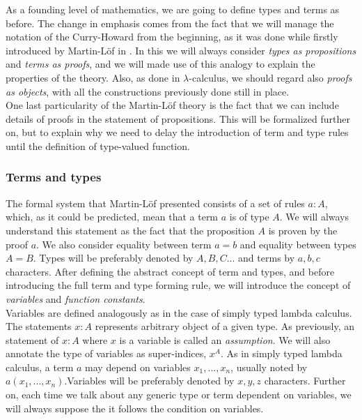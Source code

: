 As a founding level of mathematics, we are going to define types and terms as before. The change in emphasis comes from the fact that we will manage the notation of the Curry-Howard from the beginning, as it was done while firstly introduced by Martin-L\"of in \cite{martinlof1973intuitionistic}. In this we will always consider \emph{types as propositions} and \emph{terms as proofs}, and we will made use of this analogy to explain the properties of the theory. Also, as done in $\lambda$-calculus, we should regard also \emph{proofs as objects}, with all the constructions previously done still in place.\\

One last particularity of the Martin-L\"of theory is the fact that we can include details of proofs in the statement of propositions. This will be formalized further on, but to explain why we need to delay the introduction of term and type rules until the definition of type-valued function.

\subsubsection{Terms and types}

The formal system that Martin-L\"of presented consists of a set of rules $a : A$, which, as it could be predicted, mean that a term $a$ is of type $A$. We will always understand this statement as the fact that the proposition $A$ is proven by the proof $a$. We also consider equality between term $a = b$ and equality between types $A = B$. Types will be preferably denoted by $A,B,C...$ and terms by $a,b,c$ characters. After defining the abstract concept of term and types, and before introducing the full term and type forming rule, we will introduce the concept of \emph{variables} and \emph{function constants}.\\

Variables are defined analogously as in the case of simply typed lambda calculus. The statements $x: A$ represents arbitrary object of a given type. As previously, an statement of $x: A$ where $x$ is a variable is called an \emph{assumption}. We will also annotate the type of variables as super-indices, $x^A$. As in simply typed lambda calculus, a term $a$ may depend on variables $x_1,...,x_n$, usually noted by $a(x_1,...,x_n)$.Variables will be preferably denoted by $x,y,z$ characters. Further on, each time we talk about any generic type or term dependent on variables, we will always suppose the it follows the condition on variables.\\

